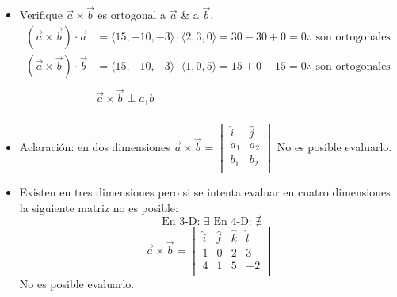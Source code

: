 \begin{itemize}
    \item Verifique $\vec{a}\times \vec{b}$ es ortogonal a $\vec{a}$ \& a $\vec{b}$.
        \begin{align*}
            (\vec{a}\times \vec{b})\cdot \vec{a} & = \langle 15,-10,-3 \rangle \cdot \langle 2,3,0 \rangle = 30-30+0 = 0 \therefore \text{  son ortogonales  } \\ 
            (\vec{a}\times \vec{b}) \cdot \vec{b} & = \langle 15, -10,-3\rangle \cdot \langle 1,0,5 \rangle = 15+0-15 = 0 \therefore \text{  son ortogonales  } \\ 
            \\ 
            & \vec{a}\times \vec{b} \perp a_1b \\ 
        \end{align*}
    
    \item Aclaración: en dos dimensiones $\vec{a}\times \vec{b} = \begin{vmatrix}
        \hat{i} & \hat{j} \\ 
        a_1 & a_2 \\ 
        b_1 & b_2 \\ 
    \end{vmatrix} $  No es posible evaluarlo.
    
    \item Existen en tres dimensiones pero si se intenta evaluar en cuatro dimensiones la siguiente matriz no es posible:
    \[
        \text{  En 3-D: } \exists \text{  En 4-D:  } \nexists 
    \]
        \[
           \vec{a}\times \vec{b} = \begin{vmatrix}
              \hat{i} & \hat{j} & \hat{k} & \hat{l} \\ 
              1 & 0 & 2 & 3 \\ 
              4 & 1 & 5 & -2 \\ 
          \end{vmatrix}
        \]
        No es posible evaluarlo.
    

\end{itemize}
